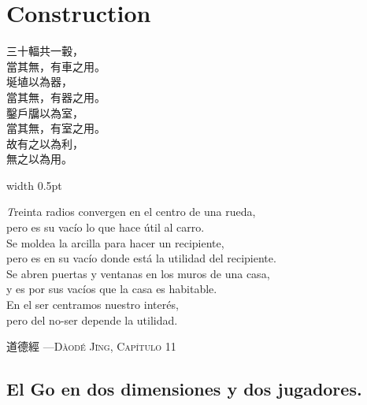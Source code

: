 {\centering
	\chapter{Construction}\label{parte2}}
\thispagestyle{empty}
\noindent
\begin{minipage}[t]{0.35\textwidth}
	\begin{flushright}
		\large
		\vspace{1pt}
		三十輻共一轂，\\
		當其無，有車之用。\\
		\vspace{0.5em}
		埏埴以為器，\\
		當其無，有器之用。\\
		\vspace{0.5em}
		鑿戶牖以為室，\\
		當其無，有室之用。\\
		\vspace{0.5em}
		故有之以為利，\\
		無之以為用。
	\end{flushright}
\end{minipage}%
\hfill
\vrule width 0.5pt %
\hfill
\begin{minipage}[t]{0.55\textwidth}
	\vspace{1pt}
	\raggedright
	\emph
	Treinta radios convergen en el centro de una rueda,\\
	pero es su vacío lo que hace útil al carro.\\
	
	\vspace{0.8em}
	Se moldea la arcilla para hacer un recipiente,\\
	pero es en su vacío donde está la utilidad del recipiente.\\
	
	\vspace{0.8em}
	Se abren puertas y ventanas en los muros de una casa,\\
	y es por sus vacíos que la casa es habitable.\\
	
	\vspace{0.8em}
	En el ser centramos nuestro interés,\\
	pero del no-ser depende la utilidad.
\end{minipage}

\vspace{1em}
\hfill {\normalfont  道德經 —\textsc{Dàodé Jīng, Capítulo 11}}

\section{El Go en dos dimensiones y dos jugadores.}

